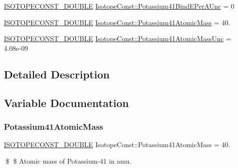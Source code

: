 \begin{DoxyCompactItemize}
\mbox{\hyperlink{group___isotope_const-_macros_ga8f45a7272ce02c0b4c65c44636ed719a}{I\+S\+O\+T\+O\+P\+E\+C\+O\+N\+S\+T\+\_\+\+D\+O\+U\+B\+LE}} \mbox{\hyperlink{group___isotope_const-_potassium-_k41_gac7ef16db7d3e76076410c936d5751b02}{Isotope\+Const\+::\+Potassium41\+Bind\+E\+Per\+A\+Unc}} = 0
\item 
\mbox{\hyperlink{group___isotope_const-_macros_ga8f45a7272ce02c0b4c65c44636ed719a}{I\+S\+O\+T\+O\+P\+E\+C\+O\+N\+S\+T\+\_\+\+D\+O\+U\+B\+LE}} \mbox{\hyperlink{group___isotope_const-_potassium-_k41_ga42adeea6f7db45f88c5e2aa021f62a2f}{Isotope\+Const\+::\+Potassium41\+Atomic\+Mass}} = 40.
\item 
\mbox{\hyperlink{group___isotope_const-_macros_ga8f45a7272ce02c0b4c65c44636ed719a}{I\+S\+O\+T\+O\+P\+E\+C\+O\+N\+S\+T\+\_\+\+D\+O\+U\+B\+LE}} \mbox{\hyperlink{group___isotope_const-_potassium-_k41_ga2aafac16bcefbe75e7038ce3acbe4fcf}{Isotope\+Const\+::\+Potassium41\+Atomic\+Mass\+Unc}} = 4.\+08e-\/09
\end{DoxyCompactItemize}


\subsection{Detailed Description}


\subsection{Variable Documentation}
\mbox{\label{group___isotope_const-_potassium-_k41_ga42adeea6f7db45f88c5e2aa021f62a2f}} 
\subsubsection{\texorpdfstring{Potassium41\+Atomic\+Mass}{Potassium41AtomicMass}}
{\footnotesize\ttfamily \mbox{\hyperlink{group___isotope_const-_macros_ga8f45a7272ce02c0b4c65c44636ed719a}{I\+S\+O\+T\+O\+P\+E\+C\+O\+N\+S\+T\+\_\+\+D\+O\+U\+B\+LE}} Isotope\+Const\+::\+Potassium41\+Atomic\+Mass = 40.}

\$ \$ Atomic mass of Potassium-\/41 in amu. \mbox{\label{group___isotope_const-_potassium-_k41_ga2aafac16bcefbe75e7038ce3acbe4fcf}} 
